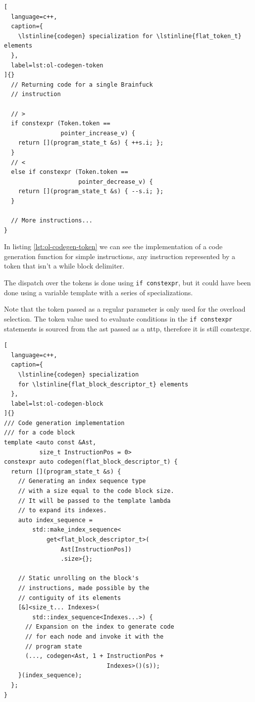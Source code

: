 \documentclass[../main]{subfiles}
\begin{document}
\begin{itemize}
\begin{lstlisting}[
  language=c++,
  caption={
    \lstinline{codegen} specialization for \lstinline{flat_token_t} elements
  },
  label=lst:ol-codegen-token
]{}
  // Returning code for a single Brainfuck
  // instruction

  // >
  if constexpr (Token.token ==
                pointer_increase_v) {
    return [](program_state_t &s) { ++s.i; };
  }
  // <
  else if constexpr (Token.token ==
                     pointer_decrease_v) {
    return [](program_state_t &s) { --s.i; };
  }

  // More instructions...
}
\end{lstlisting}

In listing \ref{lst:ol-codegen-token} we can see the implementation of a
code generation function for simple instructions, \ie any instruction
represented by a token that isn't a while block delimiter.

The dispatch over the tokens is done using \lstinline{if constexpr},
but it could have been done using a variable template with
a series of specializations.

Note that the token passed as a regular parameter is only used for the overload
selection. The token value used to evaluate conditions in the
\lstinline{if constexpr} statements is sourced from the \gls{ast} passed as a
\gls{nttp}, therefore it is still \gls{constexpr}.

\begin{lstlisting}[
  language=c++,
  caption={
    \lstinline{codegen} specialization
    for \lstinline{flat_block_descriptor_t} elements
  },
  label=lst:ol-codegen-block
]{}
/// Code generation implementation
/// for a code block
template <auto const &Ast,
          size_t InstructionPos = 0>
constexpr auto codegen(flat_block_descriptor_t) {
  return [](program_state_t &s) {
    // Generating an index sequence type
    // with a size equal to the code block size.
    // It will be passed to the template lambda
    // to expand its indexes.
    auto index_sequence =
        std::make_index_sequence<
            get<flat_block_descriptor_t>(
                Ast[InstructionPos])
                .size>{};

    // Static unrolling on the block's
    // instructions, made possible by the
    // contiguity of its elements
    [&]<size_t... Indexes>(
        std::index_sequence<Indexes...>) {
      // Expansion on the index to generate code
      // for each node and invoke it with the
      // program state
      (..., codegen<Ast, 1 + InstructionPos +
                             Indexes>()(s));
    }(index_sequence);
  };
}
\end{lstlisting}


\end{itemize}
\end{document}
